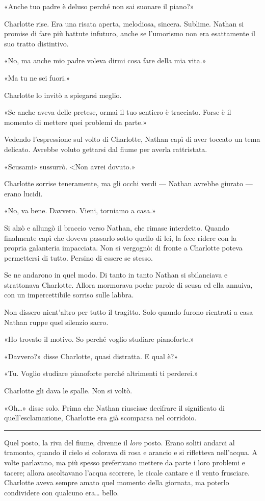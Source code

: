 \documentclass[a4paper,oneside,11pt]{memoir}
\begin{document}
«Anche tuo padre è deluso perché non sai suonare il piano?»

Charlotte rise. Era una risata aperta, melodiosa, sincera. Sublime. Nathan si
promise di fare più battute infuturo, anche se l'umorismo non era esattamente il
suo tratto distintivo.

«No, ma anche mio padre voleva dirmi cosa fare della mia vita.»

«Ma tu ne sei fuori.»

Charlotte lo invitò a spiegarsi meglio.

«Se anche aveva delle pretese, ormai il tuo sentiero è tracciato. Forse è il
momento di mettere quei problemi da parte.»

Vedendo l'espressione sul volto di Charlotte, Nathan capì di aver toccato un
tema delicato. Avrebbe voluto gettarsi dal fiume per averla rattristata.

«Scusami» sussurrò. <Non avrei dovuto.»

Charlotte sorrise teneramente, ma gli occhi verdi --- Nathan avrebbe giurato ---
erano lucidi.

«No, va bene. Davvero. Vieni, torniamo a casa.»

Si alzò e allungò il braccio verso Nathan, che rimase interdetto. Quando
finalmente capì che doveva passarlo sotto quello di lei, la fece ridere con la
propria galanteria impacciata. Non si vergognò: di fronte a Charlotte poteva
permettersi di tutto. Persino di essere se stesso.

Se ne andarono in quel modo. Di tanto in tanto Nathan si sbilanciava e
strattonava Charlotte. Allora mormorava poche parole di scusa ed ella annuiva,
con un impercettibile sorriso sulle labbra.

Non dissero nient'altro per tutto il tragitto. Solo quando furono rientrati a
casa Nathan ruppe quel silenzio sacro.

«Ho trovato il motivo. So perché voglio studiare pianoforte.»

«Davvero?» disse Charlotte, quasi distratta. E qual è?»

«Tu. Voglio studiare pianoforte perché altrimenti ti perderei.»

Charlotte gli dava le spalle. Non si voltò.

«Oh\dots{}» disse solo. Prima che Nathan riuscisse decifrare il significato di
quell'esclamazione, Charlotte era già scomparsa nel corridoio.

\plainbreak{1}

Quel posto, la riva del fiume, divenne il \emph{loro} posto. Erano soliti
andarci al tramonto, quando il cielo si colorava di rosa e arancio e si
rifletteva nell'acqua. A volte parlavano, ma più spesso preferivano mettere da
parte i loro problemi e tacere; allora ascoltavano l'acqua scorrere, le cicale
cantare e il vento frusciare. Charlotte aveva sempre amato quel momento della
giornata, ma poterlo condividere con qualcuno era\dots{} bello.
\end{document}
